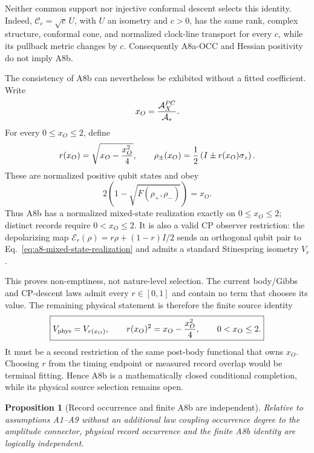 \documentclass[11pt]{article}
\newtheorem{proposition}{Proposition}
\begin{document}
Neither common support nor injective conformal descent selects this identity.
Indeed, \(\mathcal C_c=\sqrt c\,U\), with \(U\) an isometry and \(c>0\), has
the same rank, complex structure, conformal cone, and normalized clock-line
transport for every \(c\), while its pullback metric changes by \(c\).
Consequently A8a-OCC and Hessian positivity do not imply A8b.

The consistency of A8b can nevertheless be exhibited without a fitted
coefficient.  Write
\begin{equation}
 x_O={\mathcal A_X^{PC}\over\mathcal A_*}.
 \label{eq:a8-action-ratio}
\end{equation}
For every \(0\leq x_O\leq2\), define
\begin{equation}
 r(x_O)=\sqrt{x_O-{x_O^2\over4}},
 \qquad
 \rho_\pm(x_O)={1\over2}\left(I\pm r(x_O)\sigma_z\right).
 \label{eq:a8-mixed-state-realization}
\end{equation}
These are normalized positive qubit states and obey
\begin{equation}
 2\left(1-\sqrt{F(\rho_+,\rho_-)}\right)=x_O.
 \label{eq:a8-mixed-state-chord}
\end{equation}
Thus A8b has a normalized mixed-state realization exactly on
\(0\leq x_O\leq2\); distinct records require \(0<x_O\leq2\).  It is also a
valid CP observer restriction: the depolarizing map
\(\mathcal E_r(\rho)=r\rho+(1-r)I/2\) sends an orthogonal qubit pair to
Eq.~\eqref{eq:a8-mixed-state-realization} and admits a standard Stinespring
isometry \(V_r\).

This proves non-emptiness, not nature-level selection.  The current
body/Gibbs and CP-descent laws admit every \(r\in[0,1]\) and contain no term
that chooses its value.  The remaining physical statement is therefore the
finite source identity
\begin{equation}
 \boxed{
 V_{\rm phys}=V_{r(x_O)},
 \qquad r(x_O)^2=x_O-{x_O^2\over4},
 \qquad0<x_O\leq2.}
 \label{eq:a8-physical-loss-law}
\end{equation}
It must be a second restriction of the same post-body functional that owns
\(x_O\).  Choosing \(r\) from the timing endpoint or measured record overlap
would be terminal fitting.  Hence A8b is a mathematically closed conditional
completion, while its physical source selection remains open.

\begin{proposition}[Record occurrence and finite A8b are independent]
\label{prop:a8-occurrence-independence}
Relative to assumptions A1--A9 without an additional law coupling occurrence
degree to the amplitude connector, physical record occurrence and the finite
A8b identity are logically independent.
\end{proposition}
\end{document}

